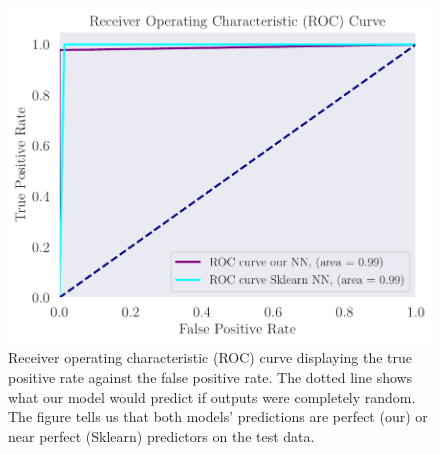 \begin{figure}
    \centering
    \includegraphics[width=0.99\linewidth]{latex/figures/ADAM_AUCROC_ADAM_relu6-100_sigmoid-2.pdf}
    \caption{Receiver operating characteristic (ROC) curve displaying the true positive rate against the false positive rate. The dotted line shows what our model would predict if outputs were completely random. The figure tells us that both models' predictions are perfect (our) or near perfect (Sklearn) predictors on the test data.}
    \label{fig:roc}
\end{figure}

